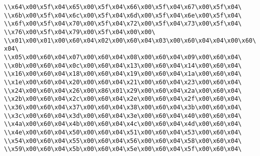\verb|\\x64\x00\x5f\x04\x65\x00\x5f\x04\x66\x00\x5f\x04\x67\x00\x5f\x04\|\newline
\verb|\\x6b\x00\x5f\x04\x6c\x00\x5f\x04\x6d\x00\x5f\x04\x6e\x00\x5f\x04\|\newline
\verb|\\x6f\x00\x5f\x04\x70\x00\x5f\x04\x72\x00\x5f\x04\x73\x00\x5f\x04\|\newline
\verb|\\x76\x00\x5f\x04\x79\x00\x5f\x04\x00\x00\|\newline
\verb|\\x01\x00\x01\x00\x60\x04\x02\x00\x60\x04\x03\x00\x60\x04\x04\x00\x60\x04\|\newline
\verb|\\x05\x00\x60\x04\x07\x00\x60\x04\x08\x00\x60\x04\x09\x00\x60\x04\|\newline
\verb|\\x0b\x00\x60\x04\x0c\x00\x60\x04\x13\x00\x60\x04\x14\x00\x60\x04\|\newline
\verb|\\x16\x00\x60\x04\x18\x00\x60\x04\x19\x00\x60\x04\x1a\x00\x60\x04\|\newline
\verb|\\x1e\x00\x60\x04\x20\x00\x60\x04\x21\x00\x60\x04\x23\x00\x60\x04\|\newline
\verb|\\x24\x00\x60\x04\x26\x00\x86\x01\x29\x00\x60\x04\x2a\x00\x60\x04\|\newline
\verb|\\x2b\x00\x60\x04\x2c\x00\x60\x04\x2e\x00\x60\x04\x2f\x00\x60\x04\|\newline
\verb|\\x36\x00\x60\x04\x37\x00\x60\x04\x38\x00\x60\x04\x3b\x00\x60\x04\|\newline
\verb|\\x3c\x00\x60\x04\x3d\x00\x60\x04\x3e\x00\x60\x04\x40\x00\x60\x04\|\newline
\verb|\\x4a\x00\x60\x04\x4b\x00\x60\x04\x4c\x00\x60\x04\x4d\x00\x60\x04\|\newline
\verb|\\x4e\x00\x60\x04\x50\x00\x60\x04\x51\x00\x60\x04\x53\x00\x60\x04\|\newline
\verb|\\x54\x00\x60\x04\x55\x00\x60\x04\x56\x00\x60\x04\x58\x00\x60\x04\|\newline
\verb|\\x59\x00\x60\x04\x5b\x00\x60\x04\x5e\x00\x60\x04\x5f\x00\x60\x04\|\newline
